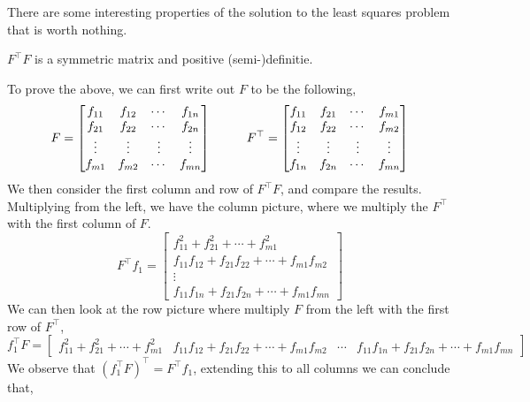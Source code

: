 There are some interesting properties of the solution to the least squares problem that is worth nothing. 
\begin{lemma}
	$F^{\top}F$ is a symmetric matrix and positive (semi-)definitie. 
\end{lemma}
To prove the above, we can first write out $F$ to be the following, 
\begin{equation}
	F = 
	\begin{bmatrix}
		f_{11} & f_{12} & \cdots & f_{1n}\\
		f_{21} & f_{22} & \cdots & f_{2n}\\
		\vdots & \vdots & \vdots & \vdots\\
		f_{m1} & f_{m2} & \cdots & f_{mn}
	\end{bmatrix}
	\hspace{10mm}
	F^{\top} = 
	\begin{bmatrix}
		f_{11} & f_{21} & \cdots & f_{m1}\\
		f_{12} & f_{22} & \cdots & f_{m2}\\
		\vdots & \vdots & \vdots & \vdots\\
		f_{1n} & f_{2n} & \cdots & f_{mn}
	\end{bmatrix}
\end{equation}
We then consider the first column and row of $F^{\top}F$, and compare the results. Multiplying from the left, we have the column picture, where we multiply the $F^{\top}$ with the first column of $F$.
\begin{equation}
	F^{\top}f_{1} = 
	\begin{bmatrix}
		f_{11}^{2} + f_{21}^{2} + \cdots + f_{m1}^{2}\\
		f_{11}f_{12} + f_{21}f_{22} + \cdots + f_{m1}f_{m2}\\
		\vdots\\
		f_{11}f_{1n} + f_{21}f_{2n} + \cdots + f_{m1}f_{mn}
	\end{bmatrix}
\end{equation}
We can then look at the row picture where multiply $F$ from the left with the first row of $F^{\top}$, 
\begin{equation}
	f_{1}^{\top}F = 
	\begin{bmatrix}
		f_{11}^{2} + f_{21}^{2} + \cdots + f_{m1}^{2} & f_{11}f_{12} + f_{21}f_{22} + \cdots + f_{m1}f_{m2} & \cdots & f_{11}f_{1n} + f_{21}f_{2n} + \cdots + f_{m1}f_{mn}
	\end{bmatrix}
\end{equation}
We observe that $(f_{1}^{\top}F)^{\top} = F^{\top}f_{1}$, extending this to all columns we can conclude that, 
